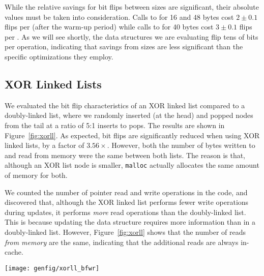 While the relative savings for bit flips between \malloc sizes are significant,
their absolute values must be taken into consideration. Calls to \malloc for 16
and 48
bytes cost $2\pm0.1$ flips per \malloc (after the warm-up period) while calls to
\malloc for 40 bytes cost $3 \pm 0.1$ flips per \malloc.
As we will see shortly, the data structures we are evaluating flip tens of bits
per operation, indicating that savings from \malloc sizes are less significant
than the specific optimizations they employ.





\subsection{XOR Linked Lists}


We evaluated the bit flip characteristics of an XOR linked list compared to a
doubly-linked list, where we randomly inserted (at the head) and popped nodes from the tail
at a ratio of 5:1 inserts to pops.
The results are shown in
Figure~\ref{fig:xorll}. As expected, bit flips are significantly reduced when
using XOR linked lists, by a factor of $3.56\times$. However, both the number of bytes written to
and read from memory were the same between both lists. The reason is that,
although an XOR list node is smaller, \texttt{malloc} actually allocates the
same amount of memory for both.

We counted the number of pointer read and write operations in the code,
and discovered that, although the XOR linked list performs fewer write
operations during updates, it performs \textit{more} read operations than the
doubly-linked list. This is because updating the data structure requires more
information than in a doubly-linked list. However, Figure~\ref{fig:xorll} shows
that the number of reads \textit{from memory} are the same, indicating that the
additional reads are always in-cache.

\begin{SCfigure}
	\centering
	\texttt{[image: genfig/xorll\_bfwr]}
	\caption{Memory characteristics of of XOR linked lists compared to Doubly-Linked
		Lists.}
	\label{fig:xorll}
\end{SCfigure}



